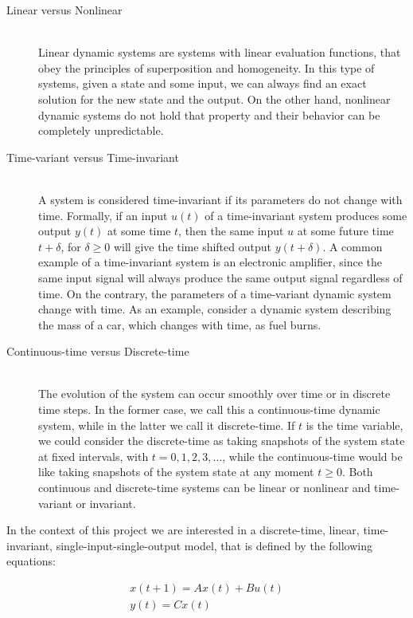 \documentclass[a4paper,11pt,twoside]{report}
\begin{document}
\begin{description}
  \item[Linear versus Nonlinear] \hfill \\
   Linear dynamic systems are systems with linear evaluation functions, that obey the principles of superposition and homogeneity. In this type of systems, given a state and some input, we can always find an exact solution for the new state and the output. On the other hand, nonlinear dynamic systems do not hold that property and their behavior can be completely unpredictable.
  \item[Time-variant versus Time-invariant] \hfill \\
    A system is considered time-invariant if its parameters do not change with time. Formally, if an input $u(t)$ of a time-invariant system produces some output $y(t)$ at some time $t$, then the same input $u$ at some future time $t+\delta$, for $ \delta \ge 0$ will give the time shifted output $y(t+\delta)$. A common example of a time-invariant system is an electronic amplifier, since the same input signal will always produce the same output signal regardless of time. On the contrary, the parameters of a time-variant dynamic system change with time. As an example, consider a dynamic system describing the mass of a car, which changes with time, as fuel burns.
  \item[Continuous-time versus Discrete-time] \hfill \\
   The evolution of the system can occur smoothly over time or in discrete time steps. In the former case, we call this a continuous-time dynamic system, while in the latter we call it discrete-time. If $t$ is the time variable, we could consider the discrete-time as taking snapshots of the system state at fixed intervals, with $t = 0,1,2,3,\dots$, while the continuous-time would be like taking snapshots of the system state at any moment $t \geq 0$. Both continuous and discrete-time systems can be linear or nonlinear and time-variant or invariant.
\end{description}


In the context of this project we are interested in a discrete-time, linear, time-invariant, single-input-single-output model, that is defined by the following equations:


\begin{eqnarray}
x(t+1) = Ax(t)+Bu(t) \label{eq:one} \\
y(t)=Cx(t)   \label{eq:two}
\end{eqnarray}
\end{document}
